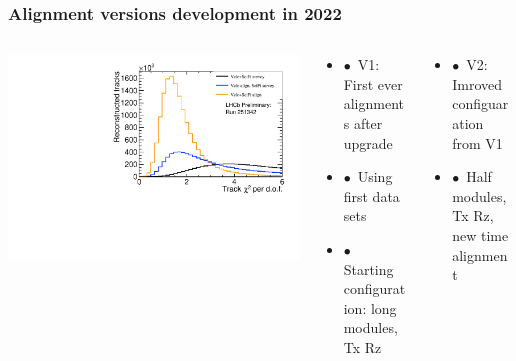 \documentclass[xcolor=dvipsnames, aspectratio=1610, 12pt]{beamer}
\begin{document}
\begin{frame}\frametitle{Alignment versions development in 2022}
  \begin{columns}
    \begin{column}[c]{0.4\textwidth}
      \centering
      \includegraphics[width=\textwidth]{logos/LHCb-FIGURE-2022-018/Run251342Preliminary_BestLong_chi2_per_ndof.pdf}
    \end{column}
    \begin{column}[c]{0.3\textwidth}
      \begin{itemize}
        \item $\bullet$\, V1: First ever alignments after upgrade
      	\item $\bullet$\, Using first data sets
        \item $\bullet$\, Starting configuration: long modules, Tx Rz
      \end{itemize}
    \end{column}
    \begin{column}[c]{0.3\textwidth}
      \begin{itemize}
        \item $\bullet$\, V2: Imroved configuaration from V1 %
        \item $\bullet$\, Half modules, Tx Rz, new time alignment
      \end{itemize}
    \end{column}
  \end{columns}
\end{frame}
\end{document}
